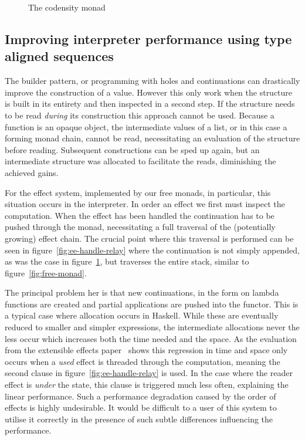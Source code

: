 \begin{figure}
  
  \caption{The codensity monad}
  \label{fig:codensity-monad}
\end{figure}
\label{sec:bind-performance}

\subsection{Improving interpreter performance using type aligned sequences}

\label{sec:type-aligned-sequence}

The builder pattern, or programming with holes and continuations can drastically
improve the construction of a value. However this only work when the structure
is built in its entirety and then inspected in a second step. If the structure
needs to be read \emph{during} its construction this approach cannot be used.
Because a function is an opaque object, the intermediate values of a list, or in
this case a forming monad chain, cannot be read, necessitating an evaluation of
the structure before reading. Subsequent constructions can be sped up again, but
an intermediate structure was allocated to facilitate the reads, diminishing the
achieved gains.

For the effect system, implemented by our free monads, in particular, this
situation occurs in the interpreter. In order an effect we first must inspect
the computation. When the effect has been handled the continuation has to be
pushed through the monad, necessitating a full traversal of the (potentially
growing) effect chain. The crucial point where this traversal is performed can
be seen in figure~\ref{fig:ee-handle-relay} where the continuation is not simply
appended, as was the case in figure~\ref{fig:codensity-monad}, but traverses the
entire stack, similar to figure~\ref{fig:free-monad}.

The principal problem her is that new continuations, in the form on lambda
functions are created and partial applications are pushed into the functor. This
is a typical case where allocation occurs in Haskell. While these are eventually
reduced to smaller and simpler expressions, the intermediate allocations never
the less occur which increases both the time needed and the space. As the
evaluation from the extensible effects paper~\cite{freer} shows this regression
in time and space only occurs when a \emph{used} effect is threaded through the
computation, meaning the second clause in figure~\ref{fig:ee-handle-relay} is
used. In the case where the reader effect is \emph{under} the state, this clause
is triggered much less often, explaining the linear performance. Such a
performance degradation caused by the order of effects is highly undesirable. It
would be difficult to a user of this system to utilise it correctly in the
presence of such subtle differences influencing the performance.

